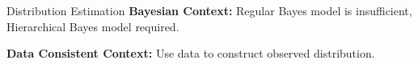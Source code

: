 \begin{block}{Distribution Estimation}
\centering
            {\large \textbf{Bayesian Context:} Regular Bayes model is insufficient, Hierarchical Bayes model required.}
           
           {\large \textbf{Data Consistent Context:} Use data to construct observed distribution. \\ \ }
           

             
\end{block}

